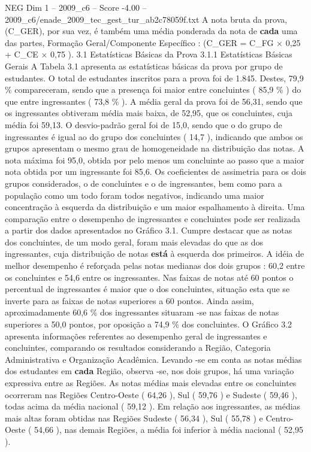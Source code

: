 \begin{textsample}{NEG Dim 1 – 2009\_c6 – Score -4.00 – 2009\_c6/enade\_2009\_tec\_gest\_tur\_ab2c78059f.txt}
A nota bruta da prova, (C\_GER), por sua vez, é também uma média ponderada da nota de \textbf{cada} uma das partes, Formação Geral/Componente Específico : (C\_GER = C\_FG × 0,25 + C\_CE × 0,75 ). 3.1 Estatísticas Básicas da Prova 3.1.1 Estatísticas Básicas Gerais A Tabela 3.1 apresenta as estatísticas básicas da prova por grupo de estudantes.
O total de estudantes inscritos para a prova foi de 1.845.
Destes, 79,9 \% compareceram, sendo que a presença foi maior entre concluintes ( 85,9 \% ) do que entre ingressantes ( 73,8 \% ).
A média geral da prova foi de 56,31, sendo que os ingressantes obtiveram média mais baixa, de 52,95, que os concluintes, cuja média foi 59,13.
O desvio-padrão geral foi de 15,0, sendo que o do grupo de ingressantes é igual ao do grupo dos concluintes ( 14,7 ), indicando que ambos os grupos apresentam o mesmo grau de homogeneidade na distribuição das notas.
A nota máxima foi 95,0, obtida por pelo menos um concluinte ao passo que a maior nota obtida por um ingressante foi 85,6.
Os coeficientes de assimetria para os dois grupos considerados, o de concluintes e o de ingressantes, bem como para a população como um todo foram todos negativos, indicando uma maior concentração à esquerda da distribuição e um maior espalhamento à direita.
Uma comparação entre o desempenho de ingressantes e concluintes pode ser realizada a partir dos dados apresentados no Gráfico 3.1.
Cumpre destacar que as notas dos concluintes, de um modo geral, foram mais elevadas do que as dos ingressantes, cuja distribuição de notas \textbf{está} à esquerda dos primeiros.
A idéia de melhor desempenho é reforçada pelas notas medianas dos dois grupos : 60,2 entre os concluintes e 54,6 entre os ingressantes.
Nas faixas de notas até 60 pontos o percentual de ingressantes é maior que o dos concluintes, situação esta que se inverte para as faixas de notas superiores a 60 pontos.
Ainda assim, aproximadamente 60,6 \% dos ingressantes situaram -se nas faixas de notas superiores a 50,0 pontos, por oposição a 74,9 \% dos concluintes.
O Gráfico 3.2 apresenta informações referentes ao desempenho geral de ingressantes e concluintes, comparando os resultados considerando a Região, Categoria Administrativa e Organização Acadêmica.
Levando -se em conta as notas médias dos estudantes em \textbf{cada} Região, observa -se, nos dois grupos, há uma variação expressiva entre as Regiões.
As notas médias mais elevadas entre os concluintes ocorreram nas Regiões Centro-Oeste ( 64,26 ), Sul ( 59,76 ) e Sudeste ( 59,46 ), todas acima da média nacional ( 59,12 ).
Em relação aos ingressantes, as médias mais altas foram obtidas nas Regiões Sudeste ( 56,34 ), Sul ( 55,78 ) e Centro-Oeste ( 54,66 ), nas demais Regiões, a média foi inferior à média nacional ( 52,95 ).

\end{textsample}
